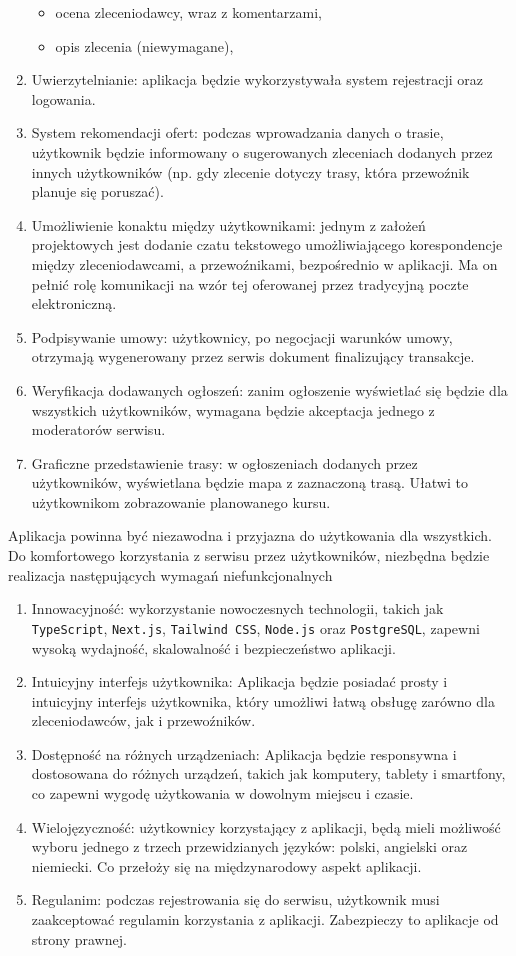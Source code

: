 \begin{enumerate}
\begin{itemize}
        \item ocena zleceniodawcy, wraz z komentarzami,
        \item opis zlecenia (niewymagane),
    \end{itemize}
    \item Uwierzytelnianie: aplikacja będzie wykorzystywała system rejestracji oraz logowania.
    \item System rekomendacji ofert: podczas wprowadzania danych o trasie, użytkownik będzie informowany o sugerowanych zleceniach dodanych przez innych użytkowników (np. gdy zlecenie dotyczy trasy, która przewoźnik planuje się poruszać).
    \item Umożliwienie konaktu między użytkownikami: jednym z założeń projektowych jest dodanie czatu tekstowego umożliwiającego korespondencje między zleceniodawcami, a przewoźnikami, bezpośrednio w aplikacji. Ma on pełnić rolę komunikacji na wzór tej  oferowanej przez tradycyjną poczte elektroniczną.
    \item Podpisywanie umowy: użytkownicy, po negocjacji warunków umowy, otrzymają wygenerowany przez serwis dokument finalizujący transakcje.
    \item Weryfikacja dodawanych ogłoszeń: zanim ogłoszenie wyświetlać się będzie dla wszystkich użytkowników, wymagana będzie akceptacja jednego z moderatorów serwisu.
    \item Graficzne przedstawienie trasy: w ogłoszeniach dodanych przez użytkowników, wyświetlana będzie mapa z zaznaczoną trasą. Ułatwi to użytkownikom zobrazowanie planowanego kursu.
\end{enumerate}
Aplikacja powinna być niezawodna i przyjazna do użytkowania dla wszystkich. Do komfortowego korzystania z serwisu przez użytkowników, niezbędna będzie realizacja następujących wymagań niefunkcjonalnych
\begin{enumerate}
    \item Innowacyjność: wykorzystanie nowoczesnych technologii, takich jak \texttt{TypeScript}, \texttt{Next.js}, \texttt{Tailwind CSS}, \texttt{Node.js} oraz \texttt{PostgreSQL}, zapewni wysoką wydajność, skalowalność i bezpieczeństwo aplikacji.
    \item Intuicyjny interfejs użytkownika: Aplikacja będzie posiadać prosty i intuicyjny interfejs użytkownika, który umożliwi łatwą obsługę zarówno dla zleceniodawców, jak i przewoźników.
    \item Dostępność na różnych urządzeniach: Aplikacja będzie responsywna i dostosowana do różnych urządzeń, takich jak komputery, tablety i smartfony, co zapewni wygodę użytkowania w dowolnym miejscu i czasie.
    \item Wielojęzyczność: użytkownicy korzystający z aplikacji, będą mieli możliwość wyboru jednego z trzech przewidzianych języków: polski, angielski oraz niemiecki. Co przełoży się na międzynarodowy aspekt aplikacji.
    \item Regulanim: podczas rejestrowania się do serwisu, użytkownik musi zaakceptować regulamin korzystania z aplikacji. Zabezpieczy to aplikacje od strony prawnej.
\end{enumerate}

